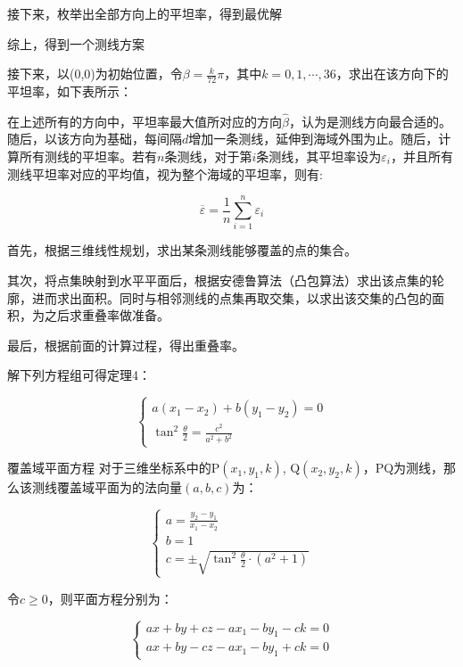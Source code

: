 接下来，枚举出全部方向上的平坦率，得到最优解

综上，得到一个测线方案

接下来，以(0,0)为初始位置，令$\beta = \frac{k}{72}\pi$，其中$k = 0, 1, \cdots, 36$，求出在该方向下的平坦率，如下表所示：




在上述所有的方向中，平坦率最大值所对应的方向$\hat \beta$，认为是测线方向最合适的。随后，以该方向为基础，每间隔$d$增加一条测线，延伸到海域外围为止。随后，计算所有测线的平坦率。若有$n$条测线，对于第$i$条测线，其平坦率设为$\varepsilon_i$，并且所有测线平坦率对应的平均值，视为整个海域的平坦率，则有:

\begin{equation}
    \overline{\varepsilon} = \frac{1}{n} \sum^{n}_{i=1}\varepsilon_i 
\end{equation}


首先，根据三维线性规划，求出某条测线能够覆盖的点的集合。

其次，将点集映射到水平平面后，根据安德鲁算法（凸包算法）求出该点集的轮廓，进而求出面积。同时与相邻测线的点集再取交集，以求出该交集的凸包的面积，为之后求重叠率做准备。

最后，根据前面的计算过程，得出重叠率。

解下列方程组可得定理4：

\begin{equation}
    \begin{cases}
        a(x_1 - x_2) + b(y_1 - y_2) = 0 \\
        \tan^2\frac{\theta}{2} = \frac{c^2}{a^2 + b^2}
    \end{cases}
\end{equation}

\begin{mcmTheorem}{覆盖域平面方程}
对于三维坐标系中的P$(x_1, y_1, k)$, Q$(x_2, y_2, k)$，PQ为测线，那么该测线覆盖域平面为的法向量$(a, b, c)$为：

\begin{equation}
    \begin{cases}
        a = \frac{y_2-y_1}{x_1-x_2} \\
        b = 1 \\
        c = \pm \sqrt{\tan^2\frac{\theta}{2} \cdot (a^2+1)}
    \end{cases}
\end{equation}

令$c \geq 0$，则平面方程分别为：

\begin{equation}
    \begin{cases}
        ax + by + cz - ax_1 - by_1 - ck = 0 \\
        ax + by - cz - ax_1 - by_1 + ck = 0
    \end{cases}
\end{equation}
\end{mcmTheorem}



\mcmSubsection{}